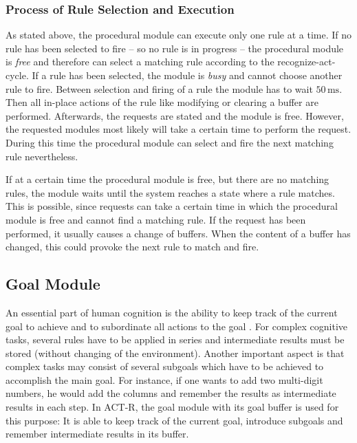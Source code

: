 \subsubsection{Process of Rule Selection and Execution}
\label{process_of_rule_selection_and_execution}


As stated above, the procedural module can execute only one rule at a time. If no rule has been selected to fire -- so no rule is in progress -- the procedural module is \emph{free} and therefore can select a matching rule according to the recognize-act-cycle. If a rule has been selected, the module is \emph{busy} and cannot choose another rule to fire. Between selection and firing of a rule the module has to wait $50\,\mathrm{ms}$. Then all in-place actions of the rule like modifying or clearing a buffer are performed. Afterwards, the requests are stated and the module is free. However, the requested modules most likely will take a certain time to perform the request. During this time the procedural module can select and fire the next matching rule nevertheless.

If at a certain time the procedural module is free, but there are no matching rules, the module waits until the system reaches a state where a rule matches. This is possible, since requests can take a certain time in which the procedural module is free and cannot find a matching rule. If the request has been performed, it usually causes a change of buffers. When the content of a buffer has changed, this could provoke the next rule to match and fire.

\subsection{Goal Module}

An essential part of human cognition is the ability to keep track of the current goal to achieve and to subordinate all actions to the goal \cite[p. 1041]{anderson_integrated_2004}. For complex cognitive tasks, several rules have to be applied in series and intermediate results must be stored (without changing of the environment). Another important aspect is that complex tasks may consist of several subgoals which have to be achieved to accomplish the main goal. For instance, if one wants to add two multi-digit numbers, he would add the columns and remember the results as intermediate results in each step. In ACT-R, the goal module with its goal buffer is used for this purpose: It is able to keep track of the current goal, introduce subgoals and remember intermediate results in its buffer. 

